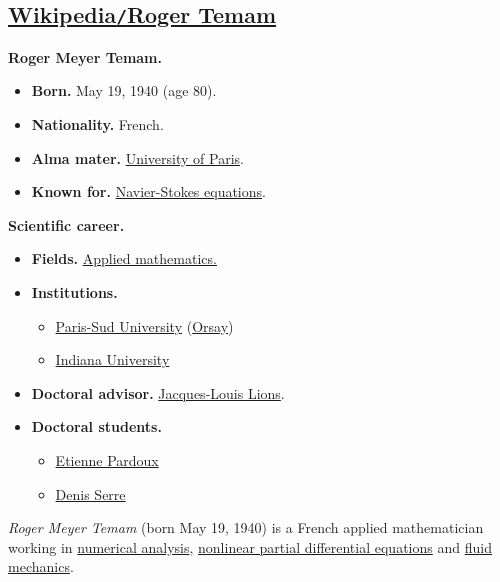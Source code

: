 \documentclass{article}
\begin{document}
\subsection{\href{https://en.wikipedia.org/wiki/Roger_Temam}{Wikipedia\texttt{/}Roger Temam}}
\textbf{Roger Meyer Temam.}
\begin{itemize}
	\item \textbf{Born.} May 19, 1940 (age 80).
	\item \textbf{Nationality.} French.
	\item \textbf{Alma mater.} \href{https://en.wikipedia.org/wiki/University_of_Paris}{University of Paris}.
	\item \textbf{Known for.} \href{https://en.wikipedia.org/wiki/Navier-Stokes_equations}{Navier-Stokes equations}.
\end{itemize}
\textbf{Scientific career.}
\begin{itemize}
	\item \textbf{Fields.} \href{https://en.wikipedia.org/wiki/Applied_mathematics}{Applied mathematics.}
	\item \textbf{Institutions.}
	\begin{itemize}
		\item \href{https://en.wikipedia.org/wiki/Paris-Sud_University}{Paris-Sud University} (\href{https://en.wikipedia.org/wiki/Orsay}{Orsay})
		\item \href{https://en.wikipedia.org/wiki/Indiana_University_Bloomington}{Indiana University}
	\end{itemize}
	\item \textbf{Doctoral advisor.} \href{https://en.wikipedia.org/wiki/Jacques-Louis_Lions}{Jacques-Louis Lions}.
	\item \textbf{Doctoral students.}
	\begin{itemize}
		\item \href{https://en.wikipedia.org/wiki/Etienne_Pardoux}{Etienne Pardoux}
		\item \href{https://en.wikipedia.org/wiki/Denis_Serre}{Denis Serre}
	\end{itemize}
\end{itemize}
\textit{Roger Meyer Temam} (born May 19, 1940) is a French applied mathematician working in \href{https://en.wikipedia.org/wiki/Numerical_analysis}{numerical analysis}, \href{https://en.wikipedia.org/wiki/Nonlinear_partial_differential_equations}{nonlinear partial differential equations} and \href{https://en.wikipedia.org/wiki/Fluid_mechanics}{fluid mechanics}.
\end{document}
